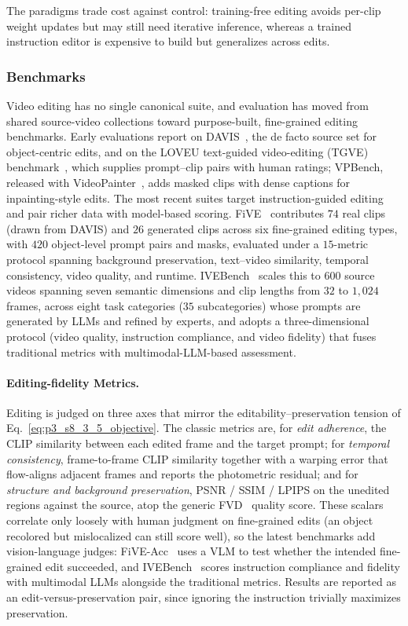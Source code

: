 The paradigms trade cost against control: training-free editing avoids per-clip weight updates but may still need iterative inference, whereas a trained instruction editor is expensive to build but generalizes across edits.

\subsubsection{Benchmarks}
\label{subsubsec:p3_s8_3_5_benchmarks}
Video editing has no single canonical suite, and evaluation has moved from shared source-video collections toward purpose-built, fine-grained editing benchmarks. Early evaluations report on DAVIS~\cite{pont20172017}, the de facto source set for object-centric edits, and on the LOVEU text-guided video-editing (TGVE) benchmark~\cite{wu2023loveutgve}, which supplies prompt--clip pairs with human ratings; VPBench, released with VideoPainter~\cite{videopainter}, adds masked clips with dense captions for inpainting-style edits. The most recent suites target instruction-guided editing and pair richer data with model-based scoring. FiVE~\cite{li2025five} contributes $74$ real clips (drawn from DAVIS) and $26$ generated clips across six fine-grained editing types, with $420$ object-level prompt pairs and masks, evaluated under a $15$-metric protocol spanning background preservation, text--video similarity, temporal consistency, video quality, and runtime. IVEBench~\cite{chen2026ivebench} scales this to $600$ source videos spanning seven semantic dimensions and clip lengths from $32$ to $1{,}024$ frames, across eight task categories ($35$ subcategories) whose prompts are generated by LLMs and refined by experts, and adopts a three-dimensional protocol (video quality, instruction compliance, and video fidelity) that fuses traditional metrics with multimodal-LLM-based assessment.

\paragraph{Editing-fidelity Metrics.}
Editing is judged on three axes that mirror the editability--preservation tension of Eq.~\eqref{eq:p3_s8_3_5_objective}. The classic metrics are, for \emph{edit adherence}, the CLIP similarity between each edited frame and the target prompt; for \emph{temporal consistency}, frame-to-frame CLIP similarity together with a warping error that flow-aligns adjacent frames and reports the photometric residual; and for \emph{structure and background preservation}, PSNR / SSIM / LPIPS on the unedited regions against the source, atop the generic FVD~\cite{unterthiner2018fvd} quality score. These scalars correlate only loosely with human judgment on fine-grained edits (an object recolored but mislocalized can still score well), so the latest benchmarks add vision-language judges: FiVE-Acc~\cite{li2025five} uses a VLM to test whether the intended fine-grained edit succeeded, and IVEBench~\cite{chen2026ivebench} scores instruction compliance and fidelity with multimodal LLMs alongside the traditional metrics. Results are reported as an edit-versus-preservation pair, since ignoring the instruction trivially maximizes preservation.

